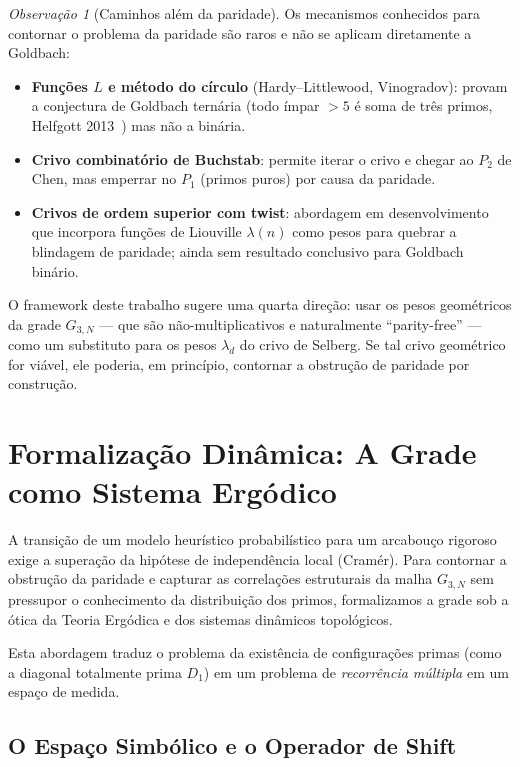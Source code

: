 \documentclass[12pt,a4paper]{article}
\theoremstyle{remark}
\newtheorem{remark}[theorem]{Observa\c{c}\~ao}
\begin{document}
	\begin{remark}[Caminhos al\'em da paridade]
		Os mecanismos conhecidos para contornar o problema da paridade s\~ao raros
		e n\~ao se aplicam diretamente a Goldbach:
		\begin{itemize}
			\item \textbf{Fun\c{c}\~oes $L$ e m\'etodo do c\'irculo} (Hardy--Littlewood, Vinogradov):
			provam a conjectura de Goldbach tern\'aria (todo \'impar $> 5$ \'e soma de tr\^es primos,
			Helfgott 2013~\cite{helfgott2013}) mas n\~ao a bin\'aria.
			\item \textbf{Crivo combinat\'orio de Buchstab}: permite iterar o crivo e chegar
			ao $P_2$ de Chen, mas emperrar no $P_1$ (primos puros) por causa da paridade.
			\item \textbf{Crivos de ordem superior com twist}: abordagem em desenvolvimento
			que incorpora fun\c{c}\~oes de Liouville $\lambda(n)$ como pesos para quebrar
			a blindagem de paridade; ainda sem resultado conclusivo para Goldbach bin\'ario.
		\end{itemize}
		O framework deste trabalho sugere uma quarta dire\c{c}\~ao: usar os pesos geom\'etricos
		da grade $G_{3,N}$ --- que s\~ao n\~ao-multiplicativos e naturalmente ``parity-free''
		--- como um substituto para os pesos $\lambda_d$ do crivo de Selberg. Se tal crivo
		geom\'etrico for vi\'avel, ele poderia, em princ\'ipio, contornar a obstru\c{c}\~ao
		de paridade por constru\c{c}\~ao.
	\end{remark}
	
	\section{Formalização Dinâmica: A Grade como Sistema Ergódico}
	\label{sec:ergodica}
	
	A transição de um modelo heurístico probabilístico para um arcabouço rigoroso exige a superação da hipótese de independência local (Cramér). Para contornar a obstrução da paridade e capturar as correlações estruturais da malha $G_{3,N}$ sem pressupor o conhecimento da distribuição dos primos, formalizamos a grade sob a ótica da Teoria Ergódica e dos sistemas dinâmicos topológicos.
	
	Esta abordagem traduz o problema da existência de configurações primas (como a diagonal totalmente prima $D_1$) em um problema de \textit{recorrência múltipla} em um espaço de medida.
	
	\subsection{O Espaço Simbólico e o Operador de Shift}
	
\end{document}
